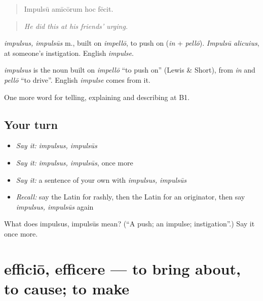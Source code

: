 \begin{quote}
Impulsū amīcōrum hoc fēcit.
\end{quote}

\begin{quote}
\emph{He did this at his friends' urging.}
\end{quote}

\emph{impulsus, impulsūs} m., built on \emph{impellō}, to push on (\emph{in} + \emph{pellō}). \emph{Impulsū alicuius}, at someone's instigation. English \emph{impulse}.

\begin{cousinweb}
\emph{impulsus} is the noun built on \emph{impellō} \textquotedblleft{}to push on\textquotedblright{} (Lewis \& Short), from \emph{in} and \emph{pellō} \textquotedblleft{}to drive\textquotedblright{}. English \emph{impulse} comes from it.
\end{cousinweb}

\begin{grammarlens}[title={What you've built}]
One more word for telling, explaining and describing at B1.
\end{grammarlens}

\subsection*{Your turn}
\begin{itemize}
\raggedright
  \item \emph{Say it:} \emph{impulsus, impulsūs}
  \item \emph{Say it:} \emph{impulsus, impulsūs}, once more
  \item \emph{Say it:} a sentence of your own with \emph{impulsus, impulsūs}
  \item \emph{Recall:} say the Latin for rashly, then the Latin for an originator, then say \emph{impulsus, impulsūs} again
\end{itemize}

\begin{tcolorbox}[breakable,colback=teal!4,colframe=teal!35!black,title={Before you move on}]
What does impulsus, impulsūs mean? (\textquotedblleft{}A push; an impulse; instigation\textquotedblright{}.) Say it once more.
\end{tcolorbox}
\section[efficiō, efficere]{efficiō, efficere — to bring about, to cause; to make}

